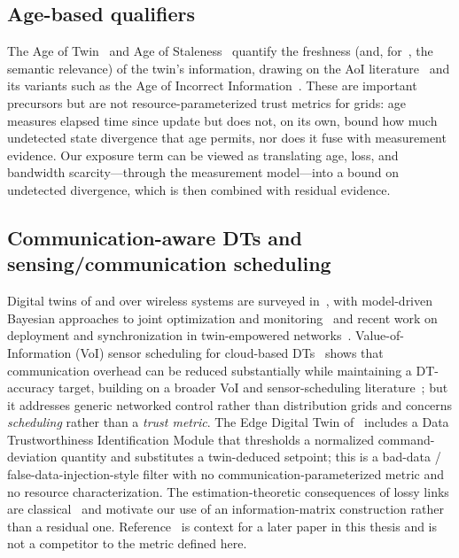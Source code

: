 \documentclass[journal]{IEEEtran}
\theoremstyle{plain}
\theoremstyle{definition}
\theoremstyle{remark}
\begin{document}
\subsection{Age-based qualifiers}
The Age of Twin~\cite{duran2023} and Age of Staleness~\cite{cosandal2026}
quantify the freshness (and, for~\cite{cosandal2026}, the semantic
relevance) of the twin's information, drawing on the AoI
literature~\cite{kaul2012,kosta2017,yates2021} and its variants such as
the Age of Incorrect Information~\cite{maatouk2020}. These are important
precursors but are not resource-parameterized trust metrics for grids: age
measures elapsed time since update but does not, on its own, bound how
much undetected state divergence that age permits, nor does it fuse with
measurement evidence. Our exposure term can be viewed as translating age,
loss, and bandwidth scarcity---through the measurement model---into a
bound on undetected divergence, which is then combined with residual
evidence.

\subsection{Communication-aware DTs and sensing/communication scheduling}
Digital twins of and over wireless systems are surveyed
in~\cite{khan2022,mihai2022}, with model-driven Bayesian approaches to
joint optimization and monitoring~\cite{ruah2023} and recent work on
deployment and synchronization in twin-empowered
networks~\cite{farag2026}. Value-of-Information (VoI) sensor scheduling
for cloud-based DTs~\cite{bui2024} shows that communication overhead can
be reduced substantially while maintaining a DT-accuracy target, building
on a broader VoI and sensor-scheduling
literature~\cite{soleymani2022,molin2019,chiariotti2022,shi2011}; but it
addresses generic networked control rather than distribution grids and
concerns \emph{scheduling} rather than a \emph{trust metric}. The Edge
Digital Twin of~\cite{guo2025} includes a Data Trustworthiness
Identification Module that thresholds a normalized command-deviation
quantity and substitutes a twin-deduced setpoint; this is a bad-data /
false-data-injection-style filter with no communication-parameterized
metric and no resource characterization. The estimation-theoretic
consequences of lossy links are classical~\cite{sinopoli2004,schenato2007}
and motivate our use of an information-matrix construction rather than a
residual one. Reference~\cite{bui2024} is context for a later paper in
this thesis and is not a competitor to the metric defined here.
\end{document}
